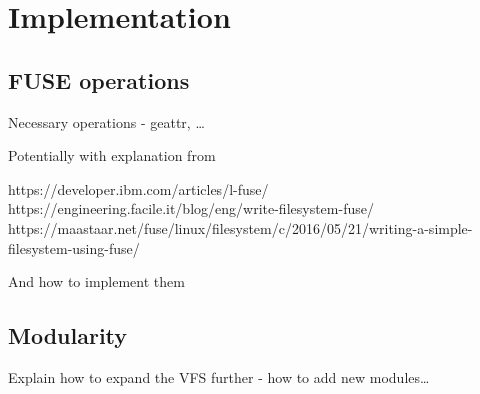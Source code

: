 \chapter{Implementation}
\label{chap:implementation}

\section{FUSE operations}\label{sec:fuse-ops}

Necessary operations - geattr, \ldots

Potentially with explanation from

https://developer.ibm.com/articles/l-fuse/
https://engineering.facile.it/blog/eng/write-filesystem-fuse/
https://maastaar.net/fuse/linux/filesystem/c/2016/05/21/writing-a-simple-filesystem-using-fuse/

And how to implement them

\section{Modularity}\label{sec:modularity}

Explain how to expand the VFS further - how to add new modules\ldots